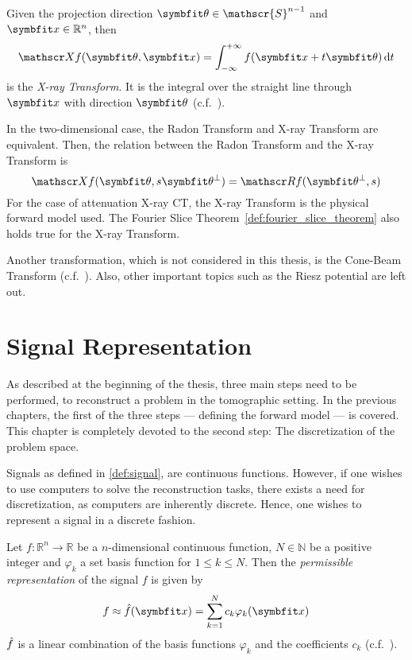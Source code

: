 \begin{definition}\label{def:x-ray_transform}
	Given the projection direction \(\mvec{\theta} \in \mathscr{S}^{n-1}\) and \(\mvec{x} \in
	\mathbb{R}^n\), then
	\[ \xray f(\mvec{\theta}, \mvec{x}) = \int_{-\infty}^{+\infty} f(\mvec{x} + t \mvec{\theta}) \, \mathrm{d} t \]
	is the \textit{X-ray Transform}. It is the integral over the straight line through
	\(\mvec{x}\) with direction \(\mvec{\theta}\)
	(c.f.~\cite{natterer_mathematics_1986,solmon_x-ray_1976}).
\end{definition}

In the two-dimensional case, the Radon Transform and X-ray Transform are equivalent.
Then, the relation between the Radon Transform and the X-ray Transform is
\begin{equation}
	\xray f(\mvec{\theta}, s\mvec{\theta}^\perp) = \radon f(\mvec{\theta}^\perp, s)
\end{equation}
For the case of attenuation X-ray CT, the X-ray Transform is the physical forward model used. The
Fourier Slice Theorem~\ref{def:fourier_slice_theorem} also holds true for the X-ray Transform.

Another transformation, which is not considered in this thesis, is the Cone-Beam Transform
(c.f.~\cite[Chapter~2]{carpio_inverse_2008}). Also, other important topics such as the Riesz
potential are left out.

\chapter{Signal Representation}\label{chap:signal_representation}

As described at the beginning of the thesis, three main steps need to be performed, to reconstruct a
problem in the tomographic setting. In the previous chapters, the first of the three steps ---
defining the forward model --- is covered. This chapter is completely devoted to the second step:
The discretization of the problem space.

Signals as defined in \autoref{def:signal}, are continuous functions. However, if one wishes to use
computers to solve the reconstruction tasks, there exists a need for discretization, as computers
are inherently discrete. Hence, one wishes to represent a signal in a discrete fashion.

\begin{definition}\label{def:permissible_representation}
	Let \(f\colon \mathbb{R}^n \to \mathbb{R}\) be a \(n\)-dimensional continuous function,
	\(N \in \mathbb{N}\) be a positive integer and \(\varphi_k\) a set basis function for
	\(1 \leq k \leq N\). Then the \textit{permissible representation} of the signal \(f\) is
	given by
	\[ f \approx \near{f}(\mvec{x}) = \sum_{k=1}^{N} c_k \varphi_k(\mvec{x}) \]
	\(\hat{f}\) is a linear combination of the basis functions \(\varphi_k\) and the
	coefficients \(c_k\) (c.f.\ \cite{herman_basis_2015}).
\end{definition}


